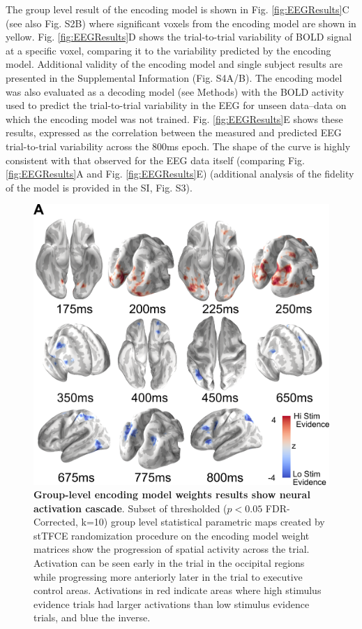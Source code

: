 The group level result of the encoding model is shown in Fig. \ref{fig:EEGResults}C (see also Fig. S2B) where significant voxels from the encoding model are shown in yellow. Fig. \ref{fig:EEGResults}D shows the trial-to-trial variability of BOLD signal at a specific voxel, comparing it to the variability predicted by the encoding model. Additional validity of the encoding model and single subject results are presented in the Supplemental Information (Fig. S4A/B). The encoding model was also evaluated as a decoding model (see Methods) with the BOLD activity used to predict the trial-to-trial variability in the EEG for unseen data--data on which the encoding model was not trained. Fig. \ref{fig:EEGResults}E shows these results, expressed as the correlation between the measured and predicted EEG trial-to-trial variability across the 800ms epoch. The shape of the curve is highly consistent with that observed for the EEG data itself (comparing Fig. \ref{fig:EEGResults}A and Fig. \ref{fig:EEGResults}E) (additional analysis of the fidelity of the model is provided in the SI, Fig. S3).


\begin{figure}[htb!]
\centering
\includegraphics[width=.5\textwidth]{Fig5.png}
\caption{\textbf{Group-level encoding model weights results show neural activation cascade}. Subset of thresholded ($p< 0.05$ FDR-Corrected, k=10) group level statistical parametric maps created by stTFCE randomization procedure on the encoding model weight matrices show the progression of spatial activity across the trial. Activation can be seen early in the trial in the occipital regions while progressing more anteriorly later in the trial to executive control areas. Activations in red indicate areas where high stimulus evidence trials had larger activations than low stimulus evidence trials, and blue the inverse.}
\label{fig:fMRIResults}
\end{figure}

